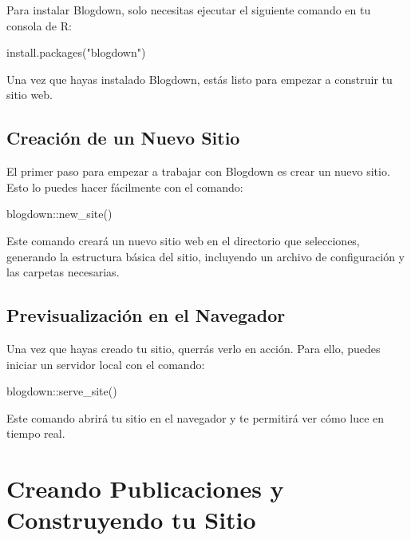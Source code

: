 \documentclass[
  doc,
  floatsintext,
  longtable,
  a4paper,
  nolmodern,
  notxfonts,
  notimes,
  colorlinks=true,linkcolor=blue,citecolor=blue,urlcolor=blue]{apa7}
\newenvironment{Shaded}{\begin{snugshade}}{\end{snugshade}}
\newcommand{\FunctionTok}[1]{\textcolor[rgb]{0.28,0.35,0.67}{#1}}
\newcommand{\NormalTok}[1]{\textcolor[rgb]{0.00,0.23,0.31}{#1}}
\newcommand{\SpecialCharTok}[1]{\textcolor[rgb]{0.37,0.37,0.37}{#1}}
\newcommand{\StringTok}[1]{\textcolor[rgb]{0.13,0.47,0.30}{#1}}
\begin{document}
Para instalar Blogdown, solo necesitas ejecutar el siguiente comando en
tu consola de R:

\begin{Shaded}
\begin{Highlighting}[]
\FunctionTok{install.packages}\NormalTok{(}\StringTok{"blogdown"}\NormalTok{)}
\end{Highlighting}
\end{Shaded}

Una vez que hayas instalado Blogdown, estás listo para empezar a
construir tu sitio web.

\subsection{Creación de un Nuevo
Sitio}\label{creaciuxf3n-de-un-nuevo-sitio}

El primer paso para empezar a trabajar con Blogdown es crear un nuevo
sitio. Esto lo puedes hacer fácilmente con el comando:

\begin{Shaded}
\begin{Highlighting}[]
\NormalTok{blogdown}\SpecialCharTok{::}\FunctionTok{new\_site}\NormalTok{()}
\end{Highlighting}
\end{Shaded}

Este comando creará un nuevo sitio web en el directorio que selecciones,
generando la estructura básica del sitio, incluyendo un archivo de
configuración y las carpetas necesarias.

\subsection{Previsualización en el
Navegador}\label{previsualizaciuxf3n-en-el-navegador}

Una vez que hayas creado tu sitio, querrás verlo en acción. Para ello,
puedes iniciar un servidor local con el comando:

\begin{Shaded}
\begin{Highlighting}[]
\NormalTok{blogdown}\SpecialCharTok{::}\FunctionTok{serve\_site}\NormalTok{()}
\end{Highlighting}
\end{Shaded}

Este comando abrirá tu sitio en el navegador y te permitirá ver cómo
luce en tiempo real.

\section{Creando Publicaciones y Construyendo tu
Sitio}\label{creando-publicaciones-y-construyendo-tu-sitio}
\end{document}
